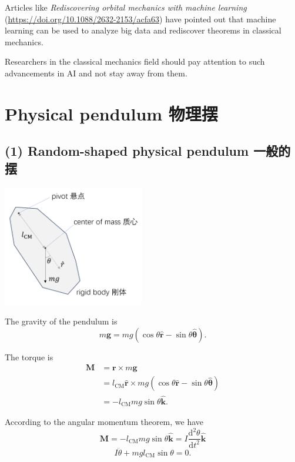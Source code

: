 Articles like \emph{Rediscovering orbital mechanics with machine learning} (\url{https://doi.org/10.1088/2632-2153/acfa63}) have pointed out that machine learning can be used to analyze big data and rediscover theorems in classical mechanics.

Researchers in the classical mechanics field should pay attention to
such advancements in AI and not stay away from them.

\section{Physical pendulum
物理摆}\label{physical-pendulum-ux7269ux7406ux6446}

\subsection*{(1) Random-shaped physical pendulum
一般的摆}\label{random-shaped-physical-pendulum-ux4e00ux822cux7684ux6446}

\begin{center}
    \includegraphics[height=150pt]{assets/Physical_pendulum.png}
\end{center}

The gravity of the pendulum is
\[m\boldsymbol{g} = mg (\cos \theta \hat{\boldsymbol{r}} - \sin \theta \hat{\boldsymbol{\theta}}).\]

The torque is \begin{align*}
    \boldsymbol{M} & = \boldsymbol{r} \times m \boldsymbol{g} \\
    & = l_{\text{CM}} \hat{\boldsymbol{r}} \times mg (\cos \theta \hat{\boldsymbol{r}} - \sin \theta \hat{\boldsymbol{\theta}}) \\
    & = - l_{\text{CM}} mg \sin \theta \hat{\boldsymbol{k}}.
\end{align*}

According to the angular momentum theorem, we have
\[\boldsymbol{M} = - l_{\text{CM}} mg \sin \theta \hat{\boldsymbol{k}} = I \frac{\mathrm{d}^2 \theta}{\mathrm{d}t^2} \hat{\boldsymbol{k}}\]
\[I \ddot{\theta} + mgl_{\text{CM}} \sin \theta = 0.\]

